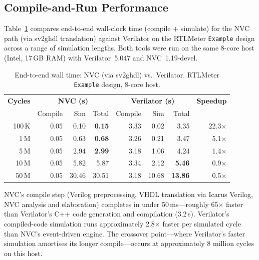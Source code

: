 
\subsection{Compile-and-Run Performance}

Table~\ref{tab:perf} compares end-to-end wall-clock time (compile + simulate)
for the NVC path (via sv2ghdl translation) against Verilator on the RTLMeter
\texttt{Example} design across a range of simulation lengths.  Both tools were
run on the same 8-core host (Intel, 17\,GB RAM) with Verilator~5.047 and
NVC~1.19-devel.

\begin{table}[h]
\centering
\caption{End-to-end wall time: NVC (via sv2ghdl) vs.\ Verilator.
         RTLMeter \texttt{Example} design, 8-core host.}
\label{tab:perf}
\begin{tabular}{r|rrr|rrr|r}
\hline
\textbf{Cycles} &
\multicolumn{3}{c|}{\textbf{NVC (s)}} &
\multicolumn{3}{c|}{\textbf{Verilator (s)}} &
\textbf{Speedup} \\
 & Compile & Sim & Total & Compile & Sim & Total & \\
\hline
100\,K   & 0.05 &  0.10 &  \textbf{0.15} & 3.33 &  0.02 &  3.35 & 22.3$\times$ \\
1\,M     & 0.05 &  0.63 &  \textbf{0.68} & 3.26 &  0.21 &  3.47 &  5.1$\times$ \\
5\,M     & 0.05 &  2.94 &  \textbf{2.99} & 3.18 &  1.06 &  4.24 &  1.4$\times$ \\
10\,M    & 0.05 &  5.82 &  5.87           & 3.34 &  2.12 &  \textbf{5.46} &  0.9$\times$ \\
50\,M    & 0.05 & 30.46 & 30.51           & 3.18 & 10.68 & \textbf{13.86} &  0.5$\times$ \\
\hline
\end{tabular}
\end{table}

NVC's compile step (Verilog preprocessing, VHDL translation via Icarus
Verilog, NVC analysis and elaboration) completes in under 50\,ms---roughly
65$\times$ faster than Verilator's C++ code generation and compilation
(3.2\,s).  Verilator's compiled-code simulation runs approximately
2.8$\times$ faster per simulated cycle than NVC's event-driven engine.  The
crossover point---where Verilator's faster simulation amortises its longer
compile---occurs at approximately 8 million cycles on this host.

